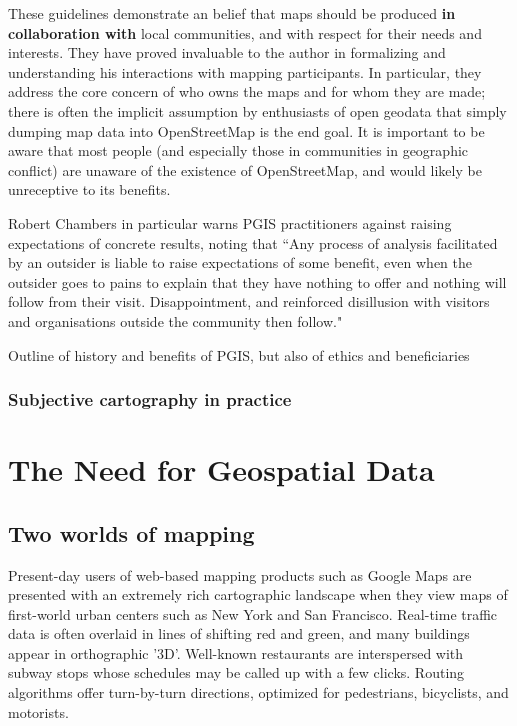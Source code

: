 \documentclass[11pt]{report}
\begin{document}
These guidelines demonstrate an belief that maps should be produced \textbf{in collaboration with} local communities, and with respect for their needs and interests. They have proved invaluable to the author in formalizing and understanding his interactions with mapping participants. In particular, they address the core concern of who owns the maps and for whom they are made; there is often the implicit assumption by enthusiasts of open geodata that simply dumping map data into OpenStreetMap is the end goal. It is important to be aware that most people (and especially those in communities in geographic conflict) are unaware of the existence of OpenStreetMap, and would likely be unreceptive to its benefits. 

Robert Chambers in particular warns PGIS practitioners against raising expectations of concrete results, noting that ``Any process of analysis facilitated by an outsider is liable to raise expectations of some benefit, even when the outsider goes to pains to explain that they have nothing to offer and nothing will follow from their visit. Disappointment, and reinforced disillusion with visitors and organisations outside the community then follow."




Outline of history and benefits of PGIS, but also of ethics and beneficiaries

\subsection{Subjective cartography in practice}

\chapter{The Need for Geospatial Data}
\section{Two worlds of mapping}

Present-day users of web-based mapping products such as Google Maps are presented with an extremely rich cartographic landscape when they view maps of first-world urban centers such as New York and San Francisco. Real-time traffic data is often overlaid in lines of shifting red and green, and many buildings appear in orthographic '3D'. Well-known restaurants are interspersed with subway stops whose schedules may be called up with a few clicks. Routing algorithms offer turn-by-turn directions, optimized for pedestrians, bicyclists, and motorists. 
\end{document}
